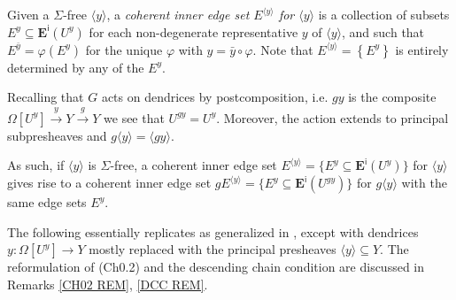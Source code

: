 \documentclass[a4paper,10pt
,draft
]{article}%
\renewcommand{\1}{\eta}%
\begin{document}
\begin{notation}
Given a $\Sigma$-free $\langle y \rangle$,
a \emph{coherent inner edge set $E^{\langle y \rangle}$ for $\langle y \rangle$}
is a collection of subsets 
$E^y \subseteq \boldsymbol{E}^{\mathsf{i}}(U^y)$
for each non-degenerate representative $y$ of $\langle y \rangle$, and such that 
$E^{\bar{y}}  = \varphi \left(E^y \right)$
for the unique $\varphi$ with $y= \bar{y} \circ \varphi$.
Note that $E^{\langle y \rangle} = \left\{E^y \right\}$
is entirely determined by any of the $E^y$.
%
\end{notation}


\begin{remark}
Recalling that $G$ acts on dendrices by postcomposition, i.e.
$gy$ is the composite
$\Omega[U^y] \xrightarrow{y} Y \xrightarrow{g} Y$
we see that $U^{gy} = U^{y}$.
Moreover, the action extends to principal subpresheaves and
$g \langle y \rangle = \langle g y \rangle$.

As such, if $\langle y\rangle$ is $\Sigma$-free, a coherent inner edge set 
$E^{\langle y \rangle} = \{E^y \subseteq \boldsymbol{E}^{\mathsf{i}}(U^y)\}$
for $\langle y \rangle$
gives rise to a coherent inner edge set 
$g E^{\langle y \rangle} = \{E^y \subseteq \boldsymbol{E}^{\mathsf{i}}(U^{gy})\}$
for $g\langle y \rangle$
with the same edge sets $E^y$.
\end{remark}



The following essentially replicates \cite[Def. 3.1]{BP_edss} as generalized in \cite[Rem. 3.7]{BP_edss},
except with dendrices
$y \colon \Omega[U^y] \to Y$
mostly replaced with the principal presheaves
$\langle y \rangle \subseteq Y$. 
The reformulation of (Ch0.2) and the descending chain condition
are discussed in Remarks \ref{CH02 REM}, \ref{DCC REM}.
\end{document}
